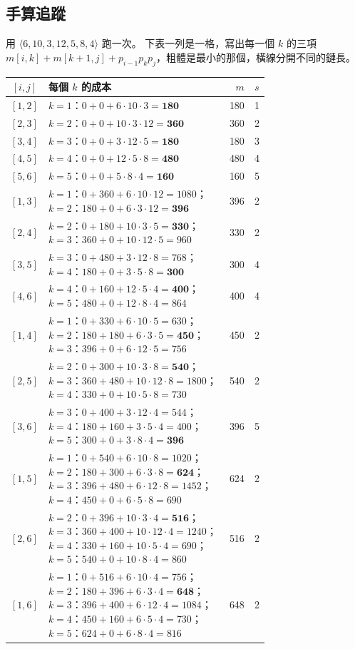 \subsection{手算追蹤}
\label{sec:dp-mc-trace}

用 $\langle 6, 10, 3, 12, 5, 8, 4 \rangle$ 跑一次。 下表一列是一格，寫出每一個 $k$ 的三項
$m[i, k] + m[k+1, j] + p_{i-1}p_k p_j$，粗體是最小的那個，橫線分開不同的鏈長。

{\small
\begin{center}
\begin{tabular}{c p{0.72\linewidth} r c}
\toprule
$[i, j]$ & 每個 $k$ 的成本 & $m$ & $s$ \\
\midrule
$[1,2]$ & $k=1$：$0+0+6\cdot10\cdot3=\mathbf{180}$ & 180 & 1 \\
$[2,3]$ & $k=2$：$0+0+10\cdot3\cdot12=\mathbf{360}$ & 360 & 2 \\
$[3,4]$ & $k=3$：$0+0+3\cdot12\cdot5=\mathbf{180}$ & 180 & 3 \\
$[4,5]$ & $k=4$：$0+0+12\cdot5\cdot8=\mathbf{480}$ & 480 & 4 \\
$[5,6]$ & $k=5$：$0+0+5\cdot8\cdot4=\mathbf{160}$ & 160 & 5 \\
\midrule
$[1,3]$ & $k=1$：$0+360+6\cdot10\cdot12=1080$；$k=2$：$180+0+6\cdot3\cdot12=\mathbf{396}$ & 396 & 2 \\
$[2,4]$ & $k=2$：$0+180+10\cdot3\cdot5=\mathbf{330}$；$k=3$：$360+0+10\cdot12\cdot5=960$ & 330 & 2 \\
$[3,5]$ & $k=3$：$0+480+3\cdot12\cdot8=768$；$k=4$：$180+0+3\cdot5\cdot8=\mathbf{300}$ & 300 & 4 \\
$[4,6]$ & $k=4$：$0+160+12\cdot5\cdot4=\mathbf{400}$；$k=5$：$480+0+12\cdot8\cdot4=864$ & 400 & 4 \\
\midrule
$[1,4]$ & $k=1$：$0+330+6\cdot10\cdot5=630$；$k=2$：$180+180+6\cdot3\cdot5=\mathbf{450}$；$k=3$：$396+0+6\cdot12\cdot5=756$ & 450 & 2 \\
$[2,5]$ & $k=2$：$0+300+10\cdot3\cdot8=\mathbf{540}$；$k=3$：$360+480+10\cdot12\cdot8=1800$；$k=4$：$330+0+10\cdot5\cdot8=730$ & 540 & 2 \\
$[3,6]$ & $k=3$：$0+400+3\cdot12\cdot4=544$；$k=4$：$180+160+3\cdot5\cdot4=400$；$k=5$：$300+0+3\cdot8\cdot4=\mathbf{396}$ & 396 & 5 \\
\midrule
$[1,5]$ & $k=1$：$0+540+6\cdot10\cdot8=1020$；$k=2$：$180+300+6\cdot3\cdot8=\mathbf{624}$；$k=3$：$396+480+6\cdot12\cdot8=1452$；$k=4$：$450+0+6\cdot5\cdot8=690$ & 624 & 2 \\
$[2,6]$ & $k=2$：$0+396+10\cdot3\cdot4=\mathbf{516}$；$k=3$：$360+400+10\cdot12\cdot4=1240$；$k=4$：$330+160+10\cdot5\cdot4=690$；$k=5$：$540+0+10\cdot8\cdot4=860$ & 516 & 2 \\
\midrule
$[1,6]$ & $k=1$：$0+516+6\cdot10\cdot4=756$；$k=2$：$180+396+6\cdot3\cdot4=\mathbf{648}$；$k=3$：$396+400+6\cdot12\cdot4=1084$；$k=4$：$450+160+6\cdot5\cdot4=730$；$k=5$：$624+0+6\cdot8\cdot4=816$ & 648 & 2 \\
\bottomrule
\end{tabular}
\end{center}
}

